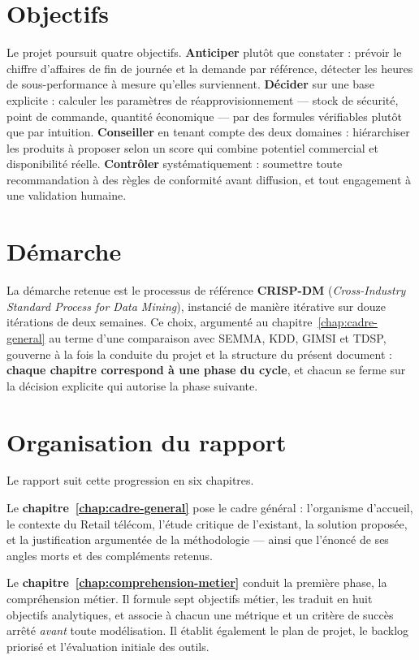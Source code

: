 \section*{Objectifs}

Le projet poursuit quatre objectifs. \textbf{Anticiper} plutôt que constater : prévoir le chiffre d'affaires de fin de journée et la demande par référence, détecter les heures de sous-performance à mesure qu'elles surviennent. \textbf{Décider} sur une base explicite : calculer les paramètres de réapprovisionnement — stock de sécurité, point de commande, quantité économique — par des formules vérifiables plutôt que par intuition. \textbf{Conseiller} en tenant compte des deux domaines : hiérarchiser les produits à proposer selon un score qui combine potentiel commercial et disponibilité réelle. \textbf{Contrôler} systématiquement : soumettre toute recommandation à des règles de conformité avant diffusion, et tout engagement à une validation humaine.

\section*{Démarche}

La démarche retenue est le processus de référence \textbf{CRISP-DM} (\textit{Cross-Industry Standard Process for Data Mining}), instancié de manière itérative sur douze itérations de deux semaines. Ce choix, argumenté au chapitre~\ref{chap:cadre-general} au terme d'une comparaison avec SEMMA, KDD, GIMSI et TDSP, gouverne à la fois la conduite du projet et la structure du présent document : \textbf{chaque chapitre correspond à une phase du cycle}, et chacun se ferme sur la décision explicite qui autorise la phase suivante.

\section*{Organisation du rapport}

Le rapport suit cette progression en six chapitres.

Le \textbf{chapitre~\ref{chap:cadre-general}} pose le cadre général : l'organisme d'accueil, le contexte du Retail télécom, l'étude critique de l'existant, la solution proposée, et la justification argumentée de la méthodologie — ainsi que l'énoncé de ses angles morts et des compléments retenus.

Le \textbf{chapitre~\ref{chap:comprehension-metier}} conduit la première phase, la compréhension métier. Il formule sept objectifs métier, les traduit en huit objectifs analytiques, et associe à chacun une métrique et un critère de succès arrêté \textit{avant} toute modélisation. Il établit également le plan de projet, le backlog priorisé et l'évaluation initiale des outils.

